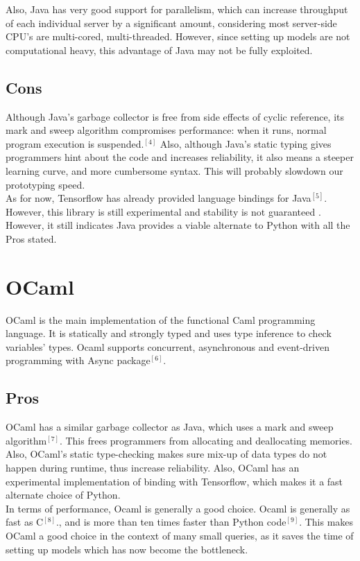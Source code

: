 \documentclass[letterpaper,twocolumn,10pt]{article}
\begin{document}
Also, Java has very good support for parallelism, which can increase throughput of each individual server by a significant amount, considering most server-side CPU's are multi-cored, multi-threaded. However, since setting up models are not computational heavy, this advantage of Java may not be fully exploited. 

\subsection{Cons}
Although Java's garbage collector is free from side effects of cyclic reference, its mark and sweep algorithm compromises performance: when it runs, normal program execution is suspended.$^{[4]}$ Also, although Java's static typing gives programmers hint about the code and increases reliability, it also means a steeper learning curve, and more cumbersome syntax. This will probably slowdown our prototyping speed. \\

As for now, Tensorflow has already provided language bindings for Java$^{[5]}$. However, this library is still experimental and stability is not guaranteed . However, it still indicates Java provides a viable alternate to Python with all the Pros stated.


\section{OCaml}
OCaml is the main implementation of the functional Caml programming language. It is statically and strongly typed and uses type inference to check variables' types. Ocaml supports concurrent, asynchronous and event-driven programming with Async package$^{[6]}$.

\subsection{Pros}
OCaml has a similar garbage collector as Java, which uses a mark and sweep algorithm$^{[7]}$. This frees programmers from allocating and deallocating memories. Also, OCaml's static type-checking makes sure mix-up of data types do not happen during runtime, thus increase reliability. Also, OCaml has an experimental implementation of binding with Tensorflow, which makes it a fast alternate choice of Python. \\

In terms of performance, Ocaml is generally a good choice. Ocaml is generally as fast as C$^{[8]}$., and is more than ten times faster than Python code$^{[9]}$. This makes OCaml a good choice in the context of many small queries, as it saves the time of setting up models which has now become the bottleneck.
\end{document}
